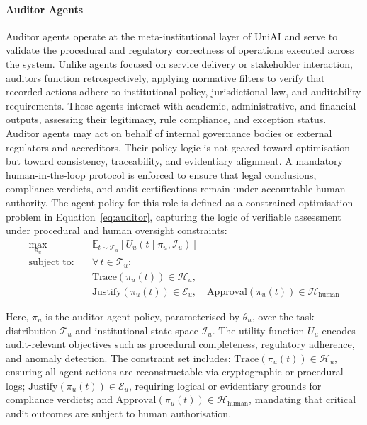 \documentclass[oneside,10pt]{swissi}
\begin{document}
\paragraph{Auditor Agents}

Auditor agents operate at the meta-institutional layer of UniAI and serve to validate the procedural and regulatory correctness of operations executed across the system. Unlike agents focused on service delivery or stakeholder interaction, auditors function retrospectively, applying normative filters to verify that recorded actions adhere to institutional policy, jurisdictional law, and auditability requirements. These agents interact with academic, administrative, and financial outputs, assessing their legitimacy, rule compliance, and exception status. Auditor agents may act on behalf of internal governance bodies or external regulators and accreditors. Their policy logic is not geared toward optimisation but toward consistency, traceability, and evidentiary alignment.
A mandatory human-in-the-loop protocol is enforced to ensure that legal conclusions, compliance verdicts, and audit certifications remain under accountable human authority. The agent policy for this role is defined as a constrained optimisation problem in Equation~\ref{eq:auditor}, capturing the logic of verifiable assessment under procedural and human oversight constraints:
\begin{align}
\label{eq:auditor}
\max_{\pi_u} \quad & \mathbb{E}_{t \sim \mathcal{T}_u} \left[ U_u(t \mid \pi_u, \mathcal{I}_u) \right] \\
\text{subject to:} \quad
& \forall\, t \in \mathcal{T}_u: \nonumber \\
& \text{Trace}(\pi_u(t)) \in \mathcal{H}_u, \nonumber \\
& \text{Justify}(\pi_u(t)) \in \mathcal{E}_u, \quad \text{Approval}(\pi_u(t)) \in \mathcal{H}_{\text{human}} \nonumber
\end{align}

Here, $\pi_u$ is the auditor agent policy, parameterised by $\theta_u$, over the task distribution $\mathcal{T}_u$ and institutional state space $\mathcal{I}_u$. The utility function $U_u$ encodes audit-relevant objectives such as procedural completeness, regulatory adherence, and anomaly detection. The constraint set includes: $\text{Trace}(\pi_u(t)) \in \mathcal{H}_u$, ensuring all agent actions are reconstructable via cryptographic or procedural logs; $\text{Justify}(\pi_u(t)) \in \mathcal{E}_u$, requiring logical or evidentiary grounds for compliance verdicts; and $\text{Approval}(\pi_u(t)) \in \mathcal{H}_{\text{human}}$, mandating that critical audit outcomes are subject to human authorisation.
\end{document}
